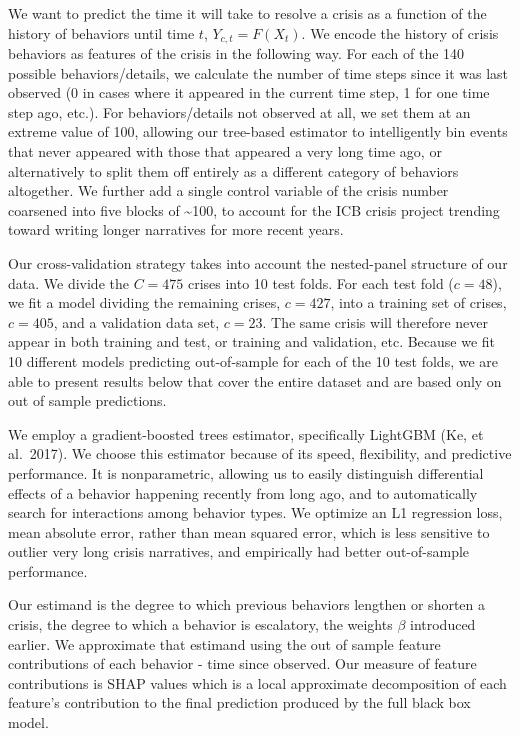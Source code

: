 \documentclass[
]{article}
\begin{document}
We want to predict the time it will take to resolve a crisis as a
function of the history of behaviors until time \(t\),
\(Y_{c,t}=F(X_t)\). We encode the history of crisis behaviors as
features of the crisis in the following way. For each of the 140
possible behaviors/details, we calculate the number of time steps since
it was last observed (0 in cases where it appeared in the current time
step, 1 for one time step ago, etc.). For behaviors/details not observed
at all, we set them at an extreme value of 100, allowing our tree-based
estimator to intelligently bin events that never appeared with those
that appeared a very long time ago, or alternatively to split them off
entirely as a different category of behaviors altogether. We further add
a single control variable of the crisis number coarsened into five
blocks of \textasciitilde100, to account for the ICB crisis project
trending toward writing longer narratives for more recent years.

Our cross-validation strategy takes into account the nested-panel
structure of our data. We divide the \(C=475\) crises into 10 test
folds. For each test fold (\(c=48\)), we fit a model dividing the
remaining crises, \(c=427\), into a training set of crises, \(c=405\),
and a validation data set, \(c=23\). The same crisis will therefore
never appear in both training and test, or training and validation, etc.
Because we fit 10 different models predicting out-of-sample for each of
the 10 test folds, we are able to present results below that cover the
entire dataset and are based only on out of sample predictions.

We employ a gradient-boosted trees estimator, specifically LightGBM (Ke,
et al.~2017). We choose this estimator because of its speed,
flexibility, and predictive performance. It is nonparametric, allowing
us to easily distinguish differential effects of a behavior happening
recently from long ago, and to automatically search for interactions
among behavior types. We optimize an L1 regression loss, mean absolute
error, rather than mean squared error, which is less sensitive to
outlier very long crisis narratives, and empirically had better
out-of-sample performance.

Our estimand is the degree to which previous behaviors lengthen or
shorten a crisis, the degree to which a behavior is escalatory, the
weights \(\beta\) introduced earlier. We approximate that estimand using
the out of sample feature contributions of each behavior - time since
observed. Our measure of feature contributions is SHAP values which is a
local approximate decomposition of each feature's contribution to the
final prediction produced by the full black box model.
\end{document}
